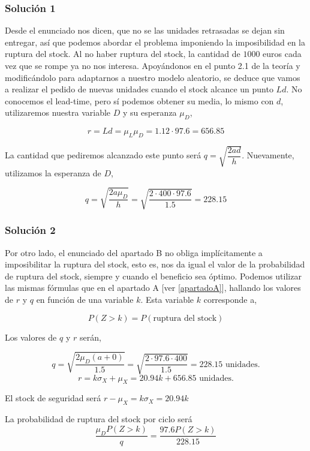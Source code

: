 \documentclass[a4paper,12pt]{article}
\begin{document}
\subsubsection{Soluci\'on 1}
Desde el enunciado nos dicen, que no se las unidades retrasadas se dejan sin entregar, as\'i que podemos abordar el problema imponiendo la imposibilidad en la ruptura del stock. Al no haber ruptura del stock, la cantidad de $1000$ euros cada vez que se rompe ya no nos interesa. Apoy\'andonos en el punto 2.1 de la teor\'ia y modific\'andolo para adaptarnos a nuestro modelo aleatorio, se deduce que vamos a realizar el pedido de nuevas unidades cuando el stock alcance un punto $Ld$. No conocemos el lead-time, pero s\'i podemos obtener su media, lo mismo con $d$, utilizaremos nuestra variable $D$ y su esperanza $\mu_D$,

$$ r = Ld = \mu_L \mu_D = 1.12 \cdot 97.6 = 656.85$$

La cantidad que pediremos alcanzado este punto ser\'a $q = \sqrt{\dfrac{2ad}{h}}$. Nuevamente, utilizamos la esperanza de $D$,

$$ q = \sqrt{\dfrac{2a\mu_D}{h}} = \sqrt{\dfrac{2\cdot 400\cdot 97.6}{1.5}} = 228.15$$

\subsubsection{Soluci\'on 2}
Por otro lado, el enunciado del apartado B no obliga impl\'icitamente a imposibilitar la ruptura del stock, esto es, nos da igual el valor de la probabilidad de ruptura del stock, siempre y cuando el beneficio sea \'optimo. Podemos utilizar las mismas f\'ormulas que en el apartado A [ver \ref{apartadoA}], hallando los valores de $r$ y $q$ en funci\'on de una variable $k$. Esta variable $k$ corresponde a,

$$ P(Z > k) = P(\text{ruptura del stock})$$

Los valores de $q$ y $r$ ser\'an,

$$ q = \sqrt{\dfrac{2\mu_D(a + 0)}{1.5}} = \sqrt{\dfrac{2\cdot 97.6\cdot 400}{1.5}} = 228.15 \text{ unidades.}$$
$$ r = k\sigma_X + \mu_X = 20.94k + 656.85 \text{ unidades.}$$

El stock de seguridad ser\'a $r - \mu_X = k\sigma_X = 20.94k$

La probabilidad de ruptura del stock por ciclo ser\'a $$ \dfrac{\mu_D P(Z > k)}{q} = \dfrac{97.6 P(Z > k)}{228.15}$$
\end{document}
